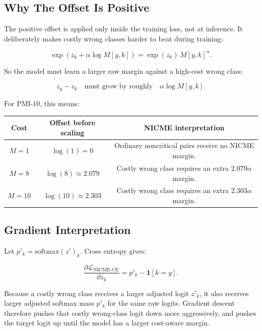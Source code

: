 \documentclass[11pt]{article}
\begin{document}
\subsection{Why The Offset Is Positive}

The positive offset is applied only inside the training loss, not at inference. It deliberately makes costly wrong classes harder to beat during training:

\begin{equation}
\exp(z_k + \alpha \log M[y,k])
=
\exp(z_k)\,M[y,k]^\alpha.
\end{equation}

So the model must learn a larger raw margin against a high-cost wrong class:

\begin{equation}
z_y - z_k
\quad\text{must grow by roughly}\quad
\alpha \log M[y,k].
\end{equation}

For PMI-10, this means:

\begin{center}
\begin{tabular}{ccc}
\toprule
Cost & Offset before scaling & NICME interpretation \\
\midrule
$M=1$ & $\log(1)=0$ & Ordinary noncritical pairs receive no NICME margin. \\
$M=8$ & $\log(8)\approx2.079$ & Costly wrong class requires an extra $2.079\alpha$ margin. \\
$M=10$ & $\log(10)\approx2.303$ & Costly wrong class requires an extra $2.303\alpha$ margin. \\
\bottomrule
\end{tabular}
\end{center}

\subsection{Gradient Interpretation}

Let $p'_k=\mathrm{softmax}(z')_k$. Cross entropy gives:

\begin{equation}
\frac{\partial \mathcal{L}_{\mathrm{NICME\text{-}CE}}}{\partial z_k}
=
p'_k - \mathbf{1}[k=y].
\end{equation}

Because a costly wrong class receives a larger adjusted logit $z'_k$, it also receives larger adjusted softmax mass $p'_k$ for the same raw logits. Gradient descent therefore pushes that costly wrong-class logit down more aggressively, and pushes the target logit up until the model has a larger cost-aware margin.
\end{document}
